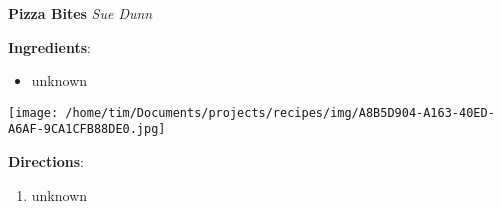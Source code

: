 \documentclass[11pt, twoside, openany]{book}
\begin{document}
\noindent\begin{minipage}[t]{\linewidth}%
{\Large\textbf{Pizza Bites}} \label{pizza-bites}\hfill\textit{Sue Dunn}\\
\noindent\begin{minipage}[t]{0.78\linewidth}%
\textbf{Ingredients}:\vspace{-3mm}
\begin{multicols}{2}
\begin{itemize}\setlength\itemsep{-1mm}
\item unknown
\end{itemize}
\end{multicols}
\end{minipage}
\noindent\begin{minipage}[t]{0.18\linewidth}
\centering \strut\vspace*{-\baselineskip}\newline
\texttt{[image: /home/tim/Documents/projects/recipes/img/A8B5D904-A163-40ED-A6AF-9CA1CFB88DE0.jpg]}\\
\end{minipage}\vspace{3mm}
\textbf{Directions}:
\vspace{-3mm}\begin{enumerate}\setlength\itemsep{-1mm}
\item unknown
\end{enumerate}
\end{minipage}\vspace{8mm}
\end{document}
